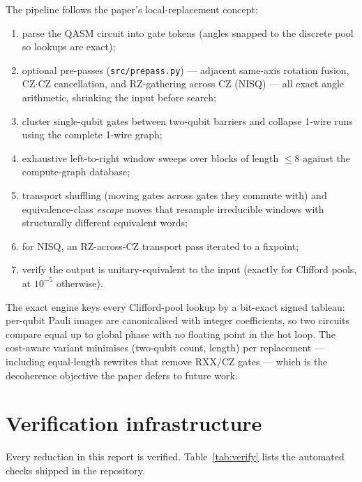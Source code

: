 \documentclass[11pt,a4paper]{article}
\begin{document}
The pipeline follows the paper's local-replacement concept:
\begin{enumerate}
    \item parse the QASM circuit into gate tokens (angles snapped to the
          discrete pool so lookups are exact);
    \item optional pre-passes (\texttt{src/prepass.py}) --- adjacent same-axis
          rotation fusion, CZ$\cdot$CZ cancellation, and RZ-gathering across CZ
          (NISQ) --- all exact angle arithmetic, shrinking the input before
          search;
    \item cluster single-qubit gates between two-qubit barriers and collapse
          1-wire runs using the complete 1-wire graph;
    \item exhaustive left-to-right window sweeps over blocks of length
          $\leq 8$ against the compute-graph database;
    \item transport shuffling (moving gates across gates they commute with)
          and equivalence-class \emph{escape} moves that resample irreducible
          windows with structurally different equivalent words;
    \item for NISQ, an RZ-across-CZ transport pass iterated to a fixpoint;
    \item verify the output is unitary-equivalent to the input
          (exactly for Clifford pools, at $10^{-5}$ otherwise).
\end{enumerate}

The exact engine keys every Clifford-pool lookup by a bit-exact signed
tableau: per-qubit Pauli images are canonicalised with integer coefficients, so
two circuits compare equal up to global phase with no floating point in the
hot loop. The cost-aware variant minimises (two-qubit count, length) per
replacement --- including equal-length rewrites that remove RXX/CZ gates ---
which is the decoherence objective the paper defers to future work.

\section{Verification infrastructure}
\label{sec:verification}
Every reduction in this report is verified. Table~\ref{tab:verify} lists the
automated checks shipped in the repository.
\end{document}
